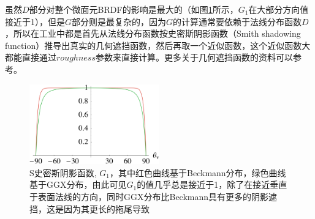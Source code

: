 虽然$D$部分对整个微面元BRDF的影响是最大的（如图\ref{f:intro-smith-shadowing-masking}所示，$G_1$在大部分方向值接近于1），但是$G$部分则是最复杂的，因为$G$的计算通常要依赖于法线分布函数$D$，所以在工业中都是首先从法线分布函数按史密斯阴影函数（Smith shadowing function）推导出真实的几何遮挡函数，然后再取一个近似函数，这个近似函数大都能直接通过$roughness$参数来直接计算。更多关于几何遮挡函数的资料可以参考\cite{a:UnderstandingtheMaskingShadowingFunctioninMicrofacetBasedBRDFs}。

\begin{figure}
	\sidecaption
	\includegraphics[width=0.5\textwidth]{figures/intro/smith-shadowing-masking}
	\caption{S史密斯阴影函数, $G_1$，其中红色曲线基于Beckmann分布，绿色曲线基于GGX分布，由此可见$G_1$的值几乎总是接近于1，除了在接近垂直于表面法线的方向，同时GGX分布比Beckmann具有更多的阴影遮挡，这是因为其更长的拖尾导致}
	\label{f:intro-smith-shadowing-masking}
\end{figure}

